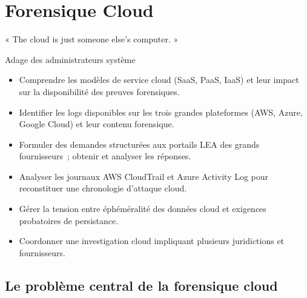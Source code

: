 
\chapter{Forensique Cloud}
\label{chap:for-cloud}

\epigraph{%
    « The cloud is just someone else's computer. »%
}{Adage des administrateurs système}


\begin{boxobjectifs}
\begin{itemize}
    \item Comprendre les modèles de service cloud (SaaS, PaaS, IaaS)
          et leur impact sur la disponibilité des preuves forensiques.
    \item Identifier les logs disponibles sur les trois grandes
          plateformes (AWS, Azure, Google Cloud) et leur contenu
          forensique.
    \item Formuler des demandes structurées aux portails LEA des
          grands fournisseurs~; obtenir et analyser les réponses.
    \item Analyser les journaux AWS CloudTrail et Azure Activity Log
          pour reconstituer une chronologie d'attaque cloud.
    \item Gérer la tension entre éphéméralité des données cloud
          et exigences probatoires de persistance.
    \item Coordonner une investigation cloud impliquant plusieurs
          juridictions et fournisseurs.
\end{itemize}
\end{boxobjectifs}

\bigskip

\section*{Le problème central de la forensique cloud}

